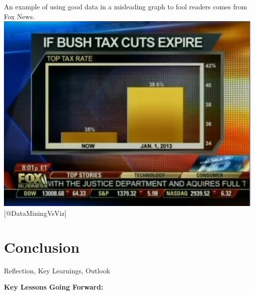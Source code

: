 \documentclass[]{book}
\theoremstyle{definition}
\theoremstyle{definition}
\theoremstyle{definition}
\theoremstyle{remark}
\begin{document}
An example of using good data in a misleading graph to fool readers
comes from Fox News. \includegraphics{images/1.png}
{[}@DataMiningVsViz{]}

\chapter{Conclusion}\label{conclusion}

Reflection, Key Learnings, Outlook

\textbf{Key Lessons Going Forward:}
\end{document}
